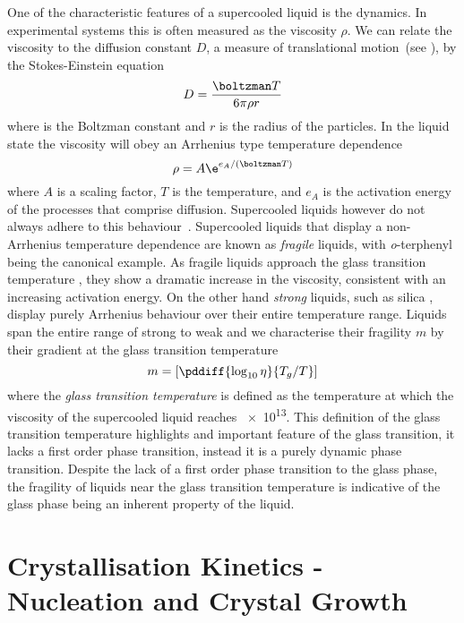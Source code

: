 One of the characteristic features of a supercooled liquid is the dynamics. In experimental systems this is often measured as the viscosity $\rho$. We can relate the viscosity to the diffusion constant $D$, a measure of translational motion~(see ), by the Stokes-Einstein equation
\begin{equation}
    D = \frac{\boltzman T}{6\pi \rho r}
\end{equation}
where \boltzman is the Boltzman constant and $r$ is the radius of the particles. In the liquid state the viscosity will obey an Arrhenius type temperature dependence
\begin{equation}
    \rho = A \e^{e_A/(\boltzman T)}
\end{equation}
where $A$ is a scaling factor, $T$ is the temperature, and $e_A$ is the activation energy of the processes that comprise diffusion. Supercooled liquids however do not always adhere to this behaviour~\figref{}. Supercooled liquids that display a non-Arrhenius temperature dependence are known as \emph{fragile} liquids, with \emph{o}-terphenyl being the canonical example. As fragile liquids approach the glass transition temperature \si{\Tg}, they show a dramatic increase in the viscosity, consistent with an increasing activation energy. On the other hand \emph{strong} liquids, such as silica , display purely Arrhenius behaviour over their entire temperature range. Liquids span the entire range of strong to weak and we characterise their fragility $m$ by their gradient at the glass transition temperature
\begin{equation}
    m = \left [ \pddiff{\log_{10}\eta}{T_g/T} \right ]
\end{equation}
where the \emph{glass transition temperature} \si{\Tg} is defined as the temperature at which the viscosity of the supercooled liquid reaches \SI{e13}{\poise}. This definition of the glass transition temperature highlights and important feature of the glass transition, it lacks a first order phase transition, instead it is a purely dynamic phase transition. Despite the lack of a first order phase transition to the glass phase, the fragility of liquids near the glass transition temperature is indicative of the glass phase being an inherent property of the liquid.

\section{Crystallisation Kinetics - Nucleation and Crystal Growth}

